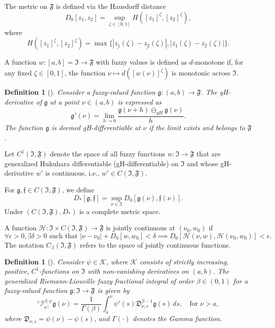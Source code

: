 \documentclass[10pt,a4paper]{amsart}
\numberwithin{equation}{section}
\newtheorem{definition}[theo]{Definition}
\begin{document}
 The metric on \(\mathfrak{F}\) is defined via the Hausdorff distance
\[
 D_0[z_1, z_2] = \sup_{\zeta \in [0,1]} H([z_1]^\zeta, [z_2]^\zeta),
\]
where
$$
 H([z_1]^\zeta, [z_{2}]^\zeta) 
 = \max \{ | \underline{z_1}(\zeta) - \underline{z_2}(\zeta) |,
 | \overline{z_1}(\zeta) - \overline{z_2}(\zeta) | \}.
$$

 A function \( w : [a,b] = \mathfrak{I} \to \mathfrak{F}\) with 
fuzzy values is defined as \(d\)-monotone if, for any fixed \(\zeta \in [0,1]\), 
the function \(\nu \mapsto d([ w(\nu )]^\zeta)\) is monotonic across \(\mathfrak{I}\).

\begin{definition}[\cite{bed}] \label{def1} \rm
Consider a fuzzy-valued function \(\mathfrak{g} : (a, b) \to \mathfrak{F}\). 
The gH-derivative of \(\mathfrak{g}\) at a point \(\nu \in (a, b)\) is expressed as
\begin{equation} \label{e2.3}
\mathfrak{g}'(\nu ) = \lim_{h \to 0} \frac{\mathfrak{g}(\nu + h)
\ominus_{gH} \mathfrak{g}(\nu )}{h}.
\end{equation}
The function \(\mathfrak{g}\) is deemed gH-differentiable at \(\nu \) if the limit
exists and belongs to \(\mathfrak{F}\).
\end{definition}

Let \( C^1(\mathfrak{I}, \mathfrak{F}) \) denote the space of all fuzzy functions 
\( w : \mathfrak{I} \to \mathfrak{F} \) that are generalized Hukuhara differentiable 
(gH-differentiable) on \( \mathfrak{I} \) and whose gH-derivative \( w' \) is 
continuous, i.e., \( w' \in C(\mathfrak{I}, \mathfrak{F}) \).

 For \(\mathfrak{g},\mathfrak{f} \in C(\mathfrak{I}, \mathfrak{F})\), we define
 \[
 D_*[\mathfrak{g}, \mathfrak{f}] 
 = \sup_{\nu \in \mathfrak{I}} D_0[\mathfrak{g}(\nu ),\mathfrak{f}(\nu )].
 \]
 Under \((C(\mathfrak{I}, \mathfrak{F}),D_*)\) is a complete metric space.

 A function \(\mathcal{H}: \mathfrak{I} \times C(\mathfrak{I}, \mathfrak{F}) 
 \to \mathfrak{F}\) is jointly continuous at \((\nu _0, w_0)\) if
 \[
 \forall \epsilon > 0, \exists \delta > 0 \text{ such that } | \nu -\nu _0| + D_0[ w, w_0] < \delta \implies D_0[\mathcal{H}(\nu , w), \mathcal{H}(\nu _0, w_0)] < \epsilon.
 \]
The notation \( C_{\mathbb{J}}(\mathfrak{I}, \mathfrak{F}) \) refers to the 
space of jointly continuous functions.

\begin{definition}[\cite{alm}] \label{def2} \rm
Consider \(\psi \in \mathcal{K}\), where \(\mathcal{K}\) consists of strictly 
increasing, positive, \(C^1\)-functions on \(\mathfrak{I}\) with non-vanishing 
derivatives on \((a, b)\). The generalized Riemann-Liouville fuzzy fractional integral 
of order \(\beta \in (0,1)\) for a fuzzy-valued function 
\(\mathfrak{g} : \mathfrak{I} \to \mathfrak{F}\) is given by
\[
{}^{c}\mathcal{I}_{a^{+}}^{\beta ; \psi} \mathfrak{g}(\nu ) 
= \frac{1}{\Gamma(\beta)} \int_{a}^{\nu } \psi'(s) \mathfrak{D}_{\nu ,s}^{\beta - 1}
 \mathfrak{g}(s) \, ds, \quad \text{for } \nu > a,
\]
where $\mathfrak{D}_{\nu ,s}=\psi(\nu )-\psi(s)$, and \(\Gamma(\cdot)\) denotes the 
Gamma function.
\end{definition}
\end{document}
